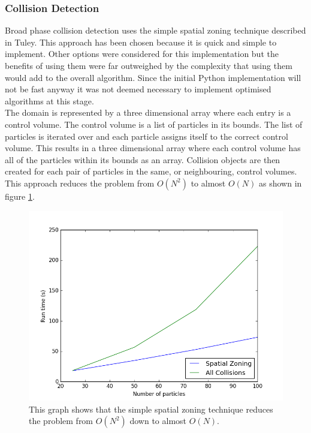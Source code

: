 \documentclass[10pt,a4paper,titlepage]{report}
\begin{document}
\subsubsection{Collision Detection}
\label{sec:Python Collision Detection}
Broad phase collision detection uses the simple spatial zoning technique described in Tuley\cite{tuley}. This approach has been chosen because it is quick and simple to implement. Other options were considered for this implementation but the benefits of using them were far outweighed by the complexity that using them would add to the overall algorithm. Since the initial Python implementation will not be fast anyway it was not deemed necessary to implement optimised algorithms at this stage.
\\The domain is represented by a three dimensional array where each entry is a control volume. The control volume is a list of particles in its bounds. The list of particles is iterated over and each particle assigns itself to the correct control volume. This results in a three dimensional array where each control volume has all of the particles within its bounds as an array. Collision objects are then created for each pair of particles in the same, or neighbouring, control volumes. This approach reduces the problem from $O(N^{2})$ to almost $O(N)$ as shown in figure \ref{fig:run_time_against_N_python}.
\begin{figure}[!ht]
\centering
\includegraphics[scale=0.75]{figures/RunTimeAgainstNumberOfParticlesPython.png}
\caption{This graph shows that the simple spatial zoning technique reduces the problem from $O(N^{2})$ down to almost $O(N)$.}
\label{fig:run_time_against_N_python}
\end{figure}
\end{document}
